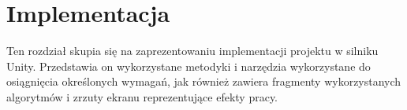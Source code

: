 \chapter{Implementacja}
Ten rozdział skupia się na zaprezentowaniu implementacji projektu w silniku Unity.
Przedstawia on wykorzystane metodyki i narzędzia wykorzystane do osiągnięcia określonych wymagań,
jak również zawiera fragmenty wykorzystanych algorytmów i zrzuty ekranu reprezentujące efekty pracy.














